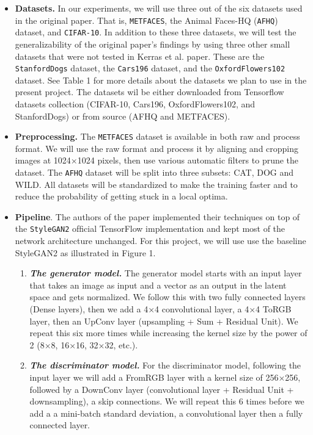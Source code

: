 \documentclass{report}
\begin{document}
\begin{itemize}
    \item \textbf{Datasets.} In our experiments, we will use three out of the six datasets used in the original paper. That is, {\tt METFACES}, the Animal Faces-HQ ({\tt AFHQ}) dataset, and {\tt CIFAR-10}. In addition to these three datasets, we will test the generalizability of the original paper's findings by using three other small datasets that were not tested in Kerras et al. paper. These are the {\tt StanfordDogs} dataset, the {\tt Cars196} dataset, and the {\tt OxfordFlowers102} dataset. See Table 1 for more details about the datasets we plan to use in the present project. The datasets wil be either downloaded from Tensorflow datasets collection (CIFAR-10, Cars196, OxfordFlowers102, and StanfordDogs) or from source (AFHQ and METFACES).
    
    \item \textbf{Preprocessing.} The {\tt METFACES} dataset is available in both raw and process format. We will use the raw format and process it by aligning and cropping images at 1024×1024 pixels, then use various automatic filters to prune the dataset. The {\tt AFHQ} dataset will be split into three subsets: CAT, DOG and WILD. All datasets will be standardized to make the training faster and to reduce the probability of getting stuck in a local optima.
    
    \item \textbf{Pipeline}.
    The authors of the paper implemented their techniques on top of the {\tt StyleGAN2} ofﬁcial TensorFlow implementation and kept most of the network architecture unchanged.  For this project, we will use  use the baseline StyleGAN2 as illustrated in Figure 1.
    \begin{enumerate}
        \item \textbf{\textit{The generator model.}} The generator model starts with an input layer that takes an image as input and a vector as an output in the latent space and gets normalized. We follow this with two fully connected layers (Dense layers), then we add a 4×4 convolutional layer, a 4×4 ToRGB layer, then an UpConv layer (upsampling + Sum + Residual Unit). We repeat this six more times while increasing the kernel size by the power of 2 (8×8, 16×16, 32×32, etc.). 
        
        \item \textbf{\textit{The discriminator model.}} For the discriminator model, following the input layer we will add a FromRGB layer with a kernel size of 256×256, followed by a DownConv layer (convolutional layer + Residual Unit + downsampling), a skip connections. We will repeat this 6 times before we add a a mini-batch standard deviation, a convolutional layer then a fully connected layer.
        

\end{enumerate}
\end{itemize}
\end{document}
